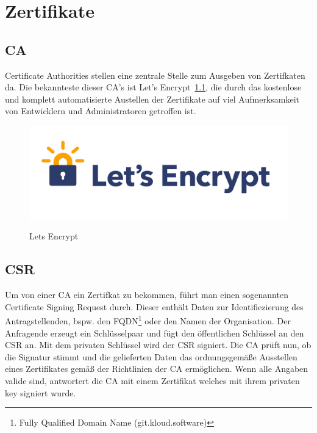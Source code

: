 \chapter{Zertifikate}
\section{CA}
Certificate Authorities stellen eine zentrale Stelle zum Ausgeben von Zertifkaten da. Die bekannteste dieser CA's ist Let's Encrypt~\ref{fig:lets-encrypt}, die durch das kostenlose und komplett automatisierte Austellen der Zertifikate auf viel Aufmerksamkeit von Entwicklern und Administratoren getroffen ist. 
\begin{figure}[!htb]
  \center\includegraphics[scale=0.4]{images/lets-encrypt-transparent.png}
  \label{fig:lets-encrypt}
  \caption{Lets Encrypt}
\end{figure}

\section{CSR}
Um von einer CA ein Zertifkat zu bekommen, führt man einen sogenannten Certificate Signing Request durch. Dieser enthält Daten zur Identifiezierung des Antragstellenden, bspw. den FQDN\footnote{Fully Qualified Domain Name (git.kloud.software)} oder den Namen der Organisation. Der Anfragende erzeugt ein Schlüsselpaar und fügt den öffentlichen Schlüssel an den CSR an. Mit dem privaten Schlüssel wird der CSR signiert. Die CA prüft nun, ob die Signatur stimmt und die gelieferten Daten das ordnungsgemäße Ausstellen eines Zertifikates gemäß der Richtlinien der CA ermöglichen. Wenn alle Angaben valide sind, antwortert die CA mit einem Zertifikat welches mit ihrem privaten key signiert wurde.

